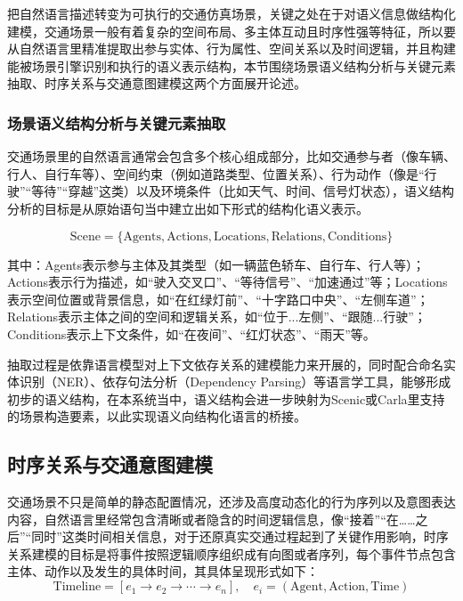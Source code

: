 把自然语言描述转变为可执行的交通仿真场景，关键之处在于对语义信息做结构化建模，交通场景一般有着复杂的空间布局、多主体互动且时序性强等特征，所以要从自然语言里精准提取出参与实体、行为属性、空间关系以及时间逻辑，并且构建能被场景引擎识别和执行的语义表示结构，本节围绕场景语义结构分析与关键元素抽取、时序关系与交通意图建模这两个方面展开论述。

\subsubsection{场景语义结构分析与关键元素抽取}

交通场景里的自然语言通常会包含多个核心组成部分，比如交通参与者（像车辆、行人、自行车等）、空间约束（例如道路类型、位置关系）、行为动作（像是“行驶”“等待”“穿越”这类）以及环境条件（比如天气、时间、信号灯状态），语义结构分析的目标是从原始语句当中建立出如下形式的结构化语义表示。

\begin{equation}
	\text{Scene} = \{ \text{Agents}, \text{Actions}, \text{Locations}, \text{Relations}, \text{Conditions} \}
\end{equation}

其中：Agents表示参与主体及其类型（如一辆蓝色轿车、自行车、行人等）；Actions表示行为描述，如“驶入交叉口”、“等待信号”、“加速通过”等；Locations表示空间位置或背景信息，如“在红绿灯前”、“十字路口中央”、“左侧车道”；Relations表示主体之间的空间和逻辑关系，如“位于...左侧”、“跟随...行驶”；Conditions表示上下文条件，如“在夜间”、“红灯状态”、“雨天”等。


抽取过程是依靠语言模型对上下文依存关系的建模能力来开展的，同时配合命名实体识别（NER）、依存句法分析（Dependency Parsing）等语言学工具，能够形成初步的语义结构，在本系统当中，语义结构会进一步映射为Scenic或Carla里支持的场景构造要素，以此实现语义向结构化语言的桥接。

\subsection{时序关系与交通意图建模}

交通场景不只是简单的静态配置情况，还涉及高度动态化的行为序列以及意图表达内容，自然语言里经常包含清晰或者隐含的时间逻辑信息，像“接着”“在……之后”“同时”这类时间相关信息，对于还原真实交通过程起到了关键作用影响，时序关系建模的目标是将事件按照逻辑顺序组织成有向图或者序列，每个事件节点包含主体、动作以及发生的具体时间，其具体呈现形式如下：
\begin{equation}
	\text{Timeline} = \left[ e_1 \rightarrow e_2 \rightarrow \cdots \rightarrow e_n \right], \quad e_i = (\text{Agent}, \text{Action}, \text{Time})
\end{equation}


